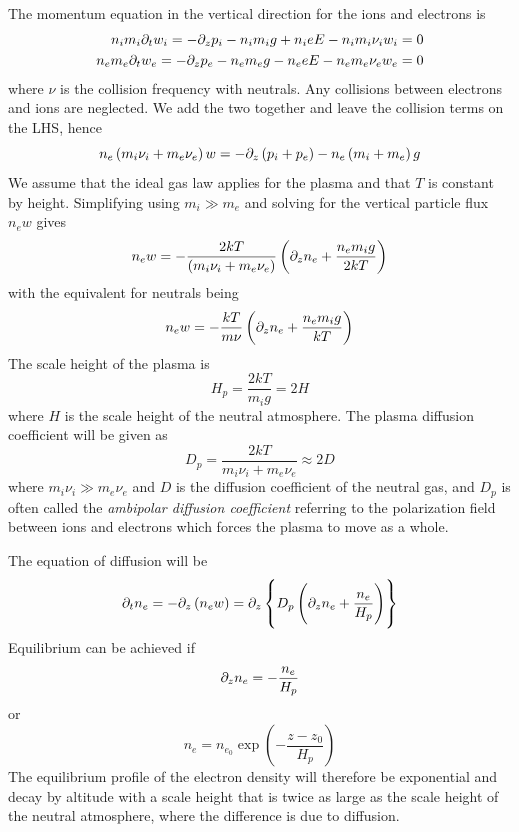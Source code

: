 The momentum equation in the vertical direction for the ions and electrons is
\begin{align*}
    n_{i}m_i\partial_{t}w_i=-\partial_{z}p_i-n_{i}m_{i}g+n_{i}eE-n_{i}m_i\nu_{i}w_i=0\\
    n_{e}m_e\partial_{t}w_e=-\partial_{z}p_e-n_{e}m_{e}g-n_{e}eE-n_{e}m_e\nu_{e}w_e=0
\end{align*}
where \(\nu \) is the collision frequency with neutrals. Any collisions between electrons and ions are neglected. We add the two together and leave the collision terms on the LHS, hence
\begin{equation*}
    n_e\left(m_i\nu_i+m_e\nu_e\right)w=-\partial_{z}\left(p_i+p_e\right)-n_e\left(m_i+m_e\right)g
\end{equation*}
We assume that the ideal gas law applies for the plasma and that \(T\) is constant by height. Simplifying using \(m_i\gg m_e\) and solving for the vertical particle flux \(n_{e}w\) gives
\begin{equation}\label{eq:L10_plasma_diffusion}
    n_{e}w=-\frac{2kT}{\left(m_i\nu_i+m_e\nu_e\right)}\left(\partial_{z}n_e+\frac{n_{e}m_{i}g}{2kT}\right)
\end{equation}
with the equivalent for neutrals being
\begin{equation*}%
    n_{e}w=-\frac{kT}{m\nu}\left(\p{z}{n_e}+\frac{n_{e}m_{i}g}{kT}\right)
\end{equation*}
The scale height of the plasma is
\begin{equation*}
    H_p=\frac{2kT}{m_{i}g}=2H
\end{equation*}
where \(H\) is the scale height of the neutral atmosphere. The plasma diffusion coefficient will be given as
\begin{equation}\label{eq:L10_plasma_diffusion_coefficient}
    D_p=\frac{2kT}{m_i\nu_i+m_e\nu_e}\approx 2D
\end{equation}
where \(m_i\nu_i\gg m_e\nu_e\) and \(D\) is the diffusion coefficient of the neutral gas, and \(D_p\) is often called the \emph{ambipolar diffusion coefficient} referring to the polarization field between ions and electrons which forces the plasma to move as a whole.

The equation of diffusion will be
\begin{equation*}
    \partial_{t}n_e=-\partial_{z}\left(n_{e}w\right)=\partial_{z}\left \{D_p\left(\partial_{z}n_e+\frac{n_e}{H_p}\right)\right \}
\end{equation*}
Equilibrium can be achieved if
\begin{equation*}
    \partial_{z}n_e=-\frac{n_e}{H_p}
\end{equation*}
or
\begin{equation*}
    n_e=n_{e_0}\exp\left(-\frac{z-z_0}{H_p}\right)
\end{equation*}
The equilibrium profile of the electron density will therefore be exponential and decay by altitude with a scale height that is twice as large as the scale height of the neutral atmosphere, where the difference is due to diffusion.

